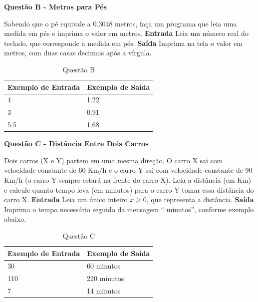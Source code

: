 \documentclass[a4paper, 12pt]{article}
\begin{document}
\newpage %
\begin{center}
\textbf{{\Large Questão B - Metros para Pés}}
\end{center}
\vspace{5pt}
Sabendo que o pé equivale a 0.3048 metros, faça um programa que leia uma medida em pés e imprima o valor
em metros.
\newline \newline
\textbf{{\large Entrada}} \newline
Leia um número real do teclado, que corresponde a medida em pés.
\newline \newline
\textbf{{\large Saída}} \newline
Imprima na tela o valor em metros, com duas casas decimais após a vírgula.
\newline
\begin{table}[H]
	\centering
	\begin{tabular}{|l|l|}
	\hline
	\textbf{Exemplo de Entrada} & \textbf{Exemplo de Saída} \\ \hline
	4 & 1.22 \\ \hline
	3 & 0.91 \\ \hline
	5.5 & 1.68 \\ \hline
	\end{tabular}
	\caption{Questão B}
	\label{tabela2}
\end{table}

\newpage %
\begin{center}
\textbf{{\Large Questão C - Distância Entre Dois Carros}}
\end{center}
\vspace{5pt}
Dois carros (X e Y) partem em uma mesma direção. O carro X sai com velocidade constante de 60 Km/h e o carro Y sai com velocidade constante de 90 Km/h (o carro Y sempre estará na frente do carro X). \newline
Leia a distância (em Km) e calcule quanto tempo leva (em minutos) para o carro Y tomar essa distância do carro X.
\newline \newline
\textbf{{\large Entrada}} \newline
Leia um único inteiro $x \geq 0$, que representa a distância.
\newline \newline
\textbf{{\large Saída}} \newline
Imprima o tempo necessário seguido da mensagem `` minutos'', conforme exemplo abaixo.
\newline
\begin{table}[H]
	\centering
	\begin{tabular}{|l|l|}
	\hline
	\textbf{Exemplo de Entrada} & \textbf{Exemplo de Saída} \\ \hline
	30 & 60 minutos \\ \hline
	110 & 220 minutos \\ \hline
	7 & 14 minutos \\ \hline
	\end{tabular}
	\caption{Questão C}
	\label{tabela3}
\end{table}
\end{document}
